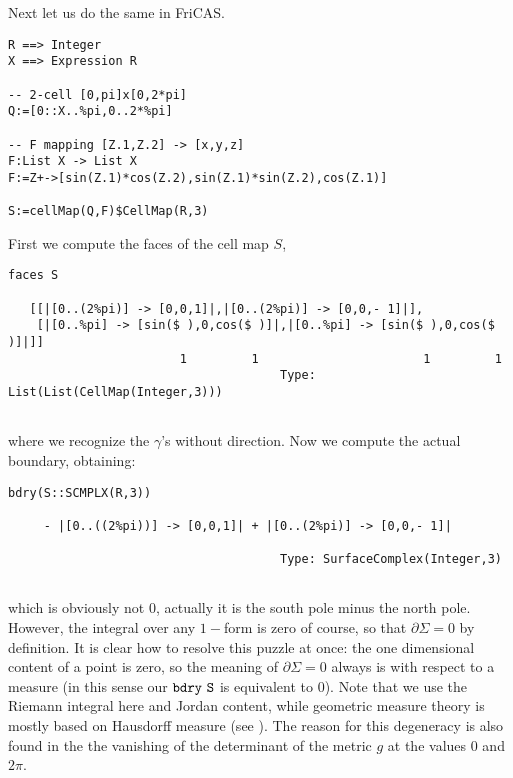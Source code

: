 \documentclass[12pt,a4paper]{article}
\begin{document}
Next let us do the same in FriCAS.
\begin{lstlisting}
R ==> Integer
X ==> Expression R

-- 2-cell [0,pi]x[0,2*pi]
Q:=[0::X..%pi,0..2*%pi]

-- F mapping [Z.1,Z.2] -> [x,y,z]
F:List X -> List X
F:=Z+->[sin(Z.1)*cos(Z.2),sin(Z.1)*sin(Z.2),cos(Z.1)]

S:=cellMap(Q,F)$CellMap(R,3)
\end{lstlisting}
First we compute the faces of the cell map $S$,
\scriptsize
\begin{verbatim}
faces S

   [[|[0..(2%pi)] -> [0,0,1]|,|[0..(2%pi)] -> [0,0,- 1]|],
    [|[0..%pi] -> [sin($ ),0,cos($ )]|,|[0..%pi] -> [sin($ ),0,cos($ )]|]]
                        1         1                       1         1
                                      Type: List(List(CellMap(Integer,3)))
                                     
\end{verbatim}
\normalsize
where we recognize the $\gamma$'s without direction. Now we compute the
actual boundary, obtaining:
\scriptsize
\begin{verbatim}
bdry(S::SCMPLX(R,3))

     - |[0..((2%pi))] -> [0,0,1]| + |[0..(2%pi)] -> [0,0,- 1]|
                                      
                                      Type: SurfaceComplex(Integer,3)
                                     
\end{verbatim}
\normalsize
which is obviously not $0$, actually it is the south pole minus the
north pole. However, the integral over any $1-$form is zero of course,
so that $\partial\Sigma=0$ by definition. It is clear how to resolve
this puzzle at once: the one dimensional content of a point is zero,
so the meaning of $\partial\Sigma=0$ always is with respect to a 
measure (in this sense our $\tt bdry\ S$ is equivalent to $0$). Note
that we use the Riemann integral here and Jordan content, while
geometric measure theory is mostly based on Hausdorff measure
(see \cite{GMT}). The reason for this degeneracy is also found in the
the vanishing of the determinant of the metric $g$ at the
values $0$ and $2\pi$.
\end{document}
